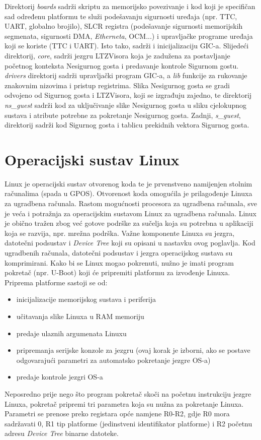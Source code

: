 \documentclass[times, utf8, diplomski, numeric]{fer}
\begin{document}
Direktorij \textit{boards} sadrži skriptu za memorijsko povezivanje i kod koji je specifičan sad određenu platformu te služi
podešavanju sigurnosti uređaja (npr. TTC, UART, globalno brojilo), SLCR registra (podešavanje sigurnosti memorijskih
segmenata, sigurnosti DMA, \textit{Etherneta}, OCM...) i upravljačke programe uređaja koji se koriste (TTC i UART). Isto tako,
sadrži i inicijalizaciju GIC-a. Slijedeći direktorij, \textit{core}, sadrži jezgru LTZVisora koja je zadužena za postavljanje
početnog konteksta Nesigurnog gosta i predavanje kontrole Sigurnom gostu. \textit{drivers} direktorij sadrži upravljački
program GIC-a, a \textit{lib} funkcije za rukovanje znakovnim nizovima i pristup registrima. Slika Nesigurnog gosta se gradi
odvojeno od Sigurnog gosta i LTZVisora, koji se izgrađuju zajedno, te direktorij \textit{ns\_guest} sadrži kod za uključivanje
slike Nesigurnog gosta u sliku cjelokupnog sustava i atribute potrebne za pokretanje Nesigurnog gosta. Zadnji,
\textit{s\_guest}, direktorij sadrži kod Sigurnog gosta i tablicu prekidnih vektora Sigurnog gosta.

\chapter{Operacijski sustav Linux}
Linux je operacijski sustav otvorenog koda te je prvenstveno namijenjen stolnim računalima (spada u GPOS).
Otvorenost koda omogućila je prilagođenje Linuxa za ugradbena računala.
Rastom mogućnosti procesora za ugradbena računala, sve je veća i potražnja za operacijskim sustavom Linux za ugradbena
računala. Linux je obično tražen zbog već gotove podrške za sučelja koja su potrebna u aplikaciji koja se razvija, npr.
mrežna podrška. Važne komponente Linuxa su jezgra, datotečni podsustav i \textit{Device Tree} koji su opisani u nastavku
ovog poglavlja. Kod ugradbenih računala, datotečni podsustav i jezgra operacijskog sustava su komprimirani.
Kako bi se Linux mogao pokrenuti, nužno je imati program pokretač (npr. U-Boot) koji će pripremiti platformu za izvođenje
Linuxa. Priprema platforme sastoji se od:
\begin{itemize}
  \item{inicijalizacije memorijskog sustava i periferija}
  \item{učitavanja slike Linuxa u RAM memoriju}
  \item{predaje ulaznih argumenata Linuxu}
  \item{pripremanja serijske konzole za jezgru (ovaj korak je izborni, ako se postave odgovarajući parametri za automatsko
  pokretanje jezgre OS-a)}
  \item{predaje kontrole jezgri OS-a}
\end{itemize}
Neposredno prije nego što program pokretač skoči na početnu instrukciju jezgre Linuxa, pokretač
pripremi tri parametra koja su nužna za pokretanje Linuxa. Parametri se prenose preko registara opće namjene R0-R2, gdje
R0 mora sadržavati 0, R1 tip platforme (jedinstveni identifikator platforme) i R2 početnu adresu \textit{Device Tree} binarne
datoteke.
\end{document}
